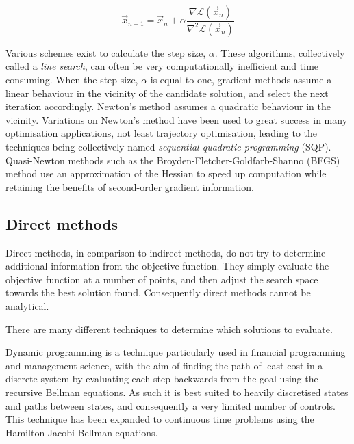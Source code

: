 \begin{equation} \label{eq:newtons-method}
\vec{x}_{n+1}=\vec{x}_n + \alpha\frac{\nabla\mathcal{L}(\vec{x}_n)}{\nabla^2\mathcal{L}(\vec{x}_n)}
\end{equation}

Various schemes exist to calculate the step size, $\alpha$. These algorithms, collectively called a \emph{line search}, can often be very computationally inefficient and time consuming. When the step size, $\alpha$ is equal to one, gradient methods assume a linear behaviour in the vicinity of the candidate solution, and select the next iteration accordingly. Newton's method assumes a quadratic behaviour in the vicinity. Variations on Newton's method have been used to great success in many optimisation applications, not least trajectory optimisation, leading to the techniques being collectively named \emph{sequential quadratic programming} (SQP). Quasi-Newton methods such as the Broyden-Fletcher-Goldfarb-Shanno (BFGS) method use an approximation of the Hessian to speed up computation while retaining the benefits of second-order gradient information. 



\subsection{Direct methods}

Direct methods, in comparison to indirect methods, do not try to determine additional information from the objective function. They simply evaluate the objective function at a number of points, and then adjust the search space towards the best solution found. Consequently direct methods cannot be analytical. %

There are many different techniques to determine which solutions to evaluate.

Dynamic programming is a technique particularly used in financial programming and management science, with the aim of finding the path of least cost in a discrete system by evaluating each step backwards from the goal using the recursive Bellman equations. As such it is best suited to heavily discretised states and paths between states, and consequently a very limited number of controls.
This technique has been expanded to continuous time problems using the Hamilton-Jacobi-Bellman equations. 

